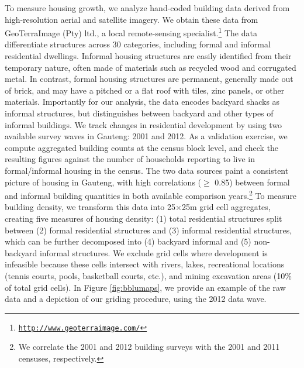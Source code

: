 \documentclass[12pt]{article}
\begin{document}
To measure housing growth, we analyze hand-coded building data derived from high-resolution aerial and satellite imagery. We obtain these data from GeoTerraImage (Pty) ltd., a local remote-sensing specialist.\footnote{\href{http://www.geoterraimage.com/}{\tt http://www.geoterraimage.com/}} The data differentiate structures across 30 categories, including formal and informal residential dwellings. Informal housing structures are easily identified from their temporary nature, often made of materials such as recycled wood and corrugated metal. In contrast, formal housing structures are permanent, generally made out of brick, and may have a pitched or a flat roof with tiles, zinc panels, or other materials. Importantly for our analysis, the data encodes backyard shacks as informal structures, but distinguishes between backyard and other types of informal buildings. We track changes in residential development by using two available survey waves in Gauteng: 2001 and 2012. As a validation exercise, we compute aggregated building counts at the census block level, and check the resulting figures against the number of households reporting to live in formal/informal housing in the census. The two data sources paint a consistent picture of housing in Gauteng, with high correlations ($\geq$ 0.85) between formal and informal building quantities in both available comparison years.\footnote{We correlate the 2001 and 2012 building surveys with the 2001 and 2011 censuses, respectively.}  To measure building density, we transform this data into 25$\times$25m grid cell aggregates, creating five measures of housing density: (1) total residential structures split between (2) formal residential structures and (3) informal residential structures, which can be further decomposed into (4) backyard informal and (5) non-backyard informal structures.  We exclude grid cells where development is infeasible because these cells intersect with rivers, lakes, recreational locations (tennis courts, pools, basketball courts, etc.), and mining excavation areas (10\% of total grid cells).  In Figure \ref{fig:bblumaps}, we provide an example of the raw data and a depiction of our griding procedure, using the 2012 data wave.
\end{document}
